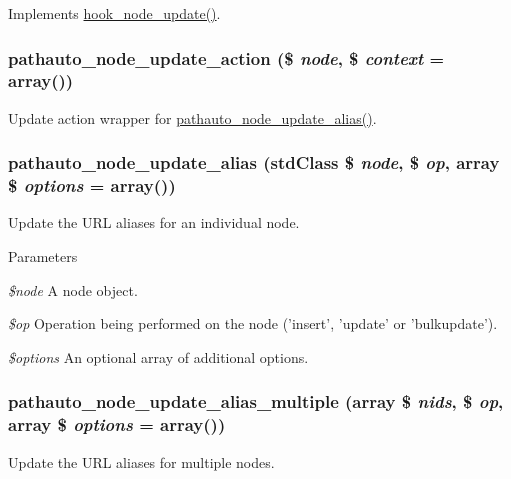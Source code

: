 \label{pathauto_8module_ae9e518cbd22ab87a5ab49500f095123b}
Implements \hyperlink{group__node__api__hooks_gac66c767cc922fcbfdaf17252e5d87d9d}{hook\_\-node\_\-update()}. \hypertarget{pathauto_8module_abe86e5924ea06f972dd7c6de8b57c7f1}{
\subsubsection[{pathauto\_\-node\_\-update\_\-action}]{\setlength{\rightskip}{0pt plus 5cm}pathauto\_\-node\_\-update\_\-action (\$ {\em node}, \/  \$ {\em context} = {\ttfamily array()})}}
\label{pathauto_8module_abe86e5924ea06f972dd7c6de8b57c7f1}
Update action wrapper for \hyperlink{pathauto_8module_a7b5113607e03d0f1d12207d737545bcf}{pathauto\_\-node\_\-update\_\-alias()}. \hypertarget{pathauto_8module_a7b5113607e03d0f1d12207d737545bcf}{
\subsubsection[{pathauto\_\-node\_\-update\_\-alias}]{\setlength{\rightskip}{0pt plus 5cm}pathauto\_\-node\_\-update\_\-alias (stdClass \$ {\em node}, \/  \$ {\em op}, \/  array \$ {\em options} = {\ttfamily array()})}}
\label{pathauto_8module_a7b5113607e03d0f1d12207d737545bcf}
Update the URL aliases for an individual node.


\begin{DoxyParams}{Parameters}
\item[{\em \$node}]A node object. \item[{\em \$op}]Operation being performed on the node ('insert', 'update' or 'bulkupdate'). \item[{\em \$options}]An optional array of additional options. \end{DoxyParams}
\hypertarget{pathauto_8module_adc92cb455997bd4a2e6504b40951cdff}{
\subsubsection[{pathauto\_\-node\_\-update\_\-alias\_\-multiple}]{\setlength{\rightskip}{0pt plus 5cm}pathauto\_\-node\_\-update\_\-alias\_\-multiple (array \$ {\em nids}, \/  \$ {\em op}, \/  array \$ {\em options} = {\ttfamily array()})}}
\label{pathauto_8module_adc92cb455997bd4a2e6504b40951cdff}
Update the URL aliases for multiple nodes.


